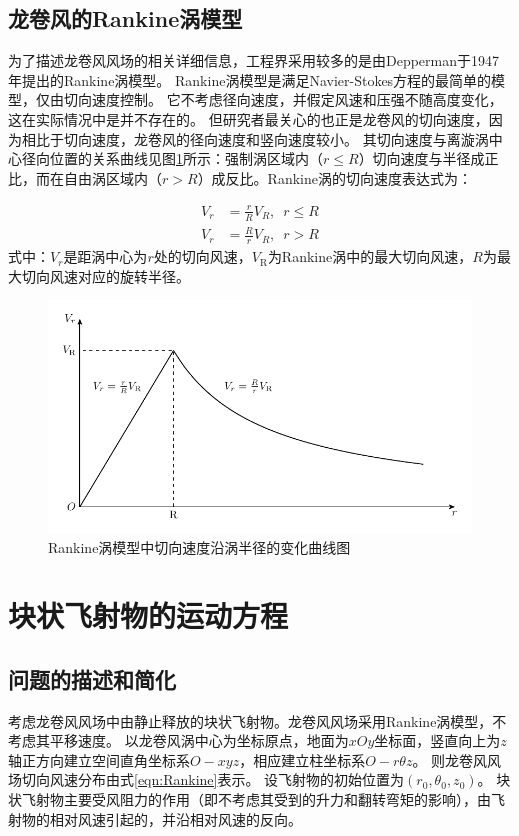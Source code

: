 \documentclass{ctexart}
\begin{document}
\subsection{龙卷风的Rankine涡模型}
为了描述龙卷风风场的相关详细信息，工程界采用较多的是由Depperman\cite{Depperman1947}于1947年提出的Rankine涡模型。
Rankine涡模型是满足Navier-Stokes方程的最简单的模型，仅由切向速度控制。
它不考虑径向速度，并假定风速和压强不随高度变化，这在实际情况中是并不存在的。
但研究者最关心的也正是龙卷风的切向速度，因为相比于切向速度，龙卷风的径向速度和竖向速度较小。
其切向速度与离漩涡中心径向位置的关系曲线见图\ref{fig:Rankine}所示：强制涡区域内（$r\leq R$）切向速度与半径成正比，而在自由涡区域内（$r > R$）成反比。Rankine涡的切向速度表达式为\cite{Commission2007}：

\begin{equation}
\label{eqn:Rankine}
\begin{split}
    V_r &= \frac{r}{R} V_R,  \,\,\, r \leq R \\
    V_r &= \frac{R}{r} V_R,  \,\,\, r > R
\end{split}
\end{equation}
式中：$V_r$是距涡中心为$r$处的切向风速，$V_{\mathrm{R}}$为Rankine涡中的最大切向风速，$R$为最大切向风速对应的旋转半径。

\begin{figure}[h]
\centering
\includegraphics{./fig/Rankine}
\caption{Rankine涡模型中切向速度沿涡半径的变化曲线图}
\label{fig:Rankine}
\end{figure}

\section{块状飞射物的运动方程}
\subsection{问题的描述和简化}
考虑龙卷风风场中由静止释放的块状飞射物。龙卷风风场采用Rankine涡模型，不考虑其平移速度。
以龙卷风涡中心为坐标原点，地面为$xOy$坐标面，竖直向上为$z$轴正方向建立空间直角坐标系$O-xyz$，相应建立柱坐标系$O-r\theta z$。
则龙卷风风场切向风速分布由式\eqref{eqn:Rankine}表示。
设飞射物的初始位置为$(r_0,\theta_0,z_0)$。
块状飞射物主要受风阻力的作用（即不考虑其受到的升力和翻转弯矩的影响），由飞射物的相对风速引起的，并沿相对风速的反向。
\end{document}
